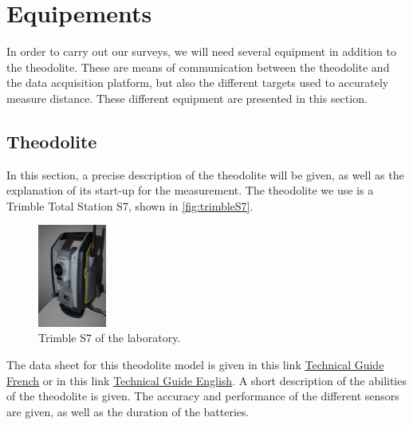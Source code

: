 \documentclass[10pt,letterpaper,oneside]{article}
\begin{document}
\section{Equipements}

In order to carry out our surveys, we will need several equipment in addition to the theodolite.
These are means of communication between the theodolite and the data acquisition platform, but also the different targets used to accurately measure distance.
These different equipment are presented in this section.


\subsection{Theodolite}


In this section, a precise description of the theodolite will be given, as well as the explanation of its start-up for the measurement.
The theodolite we use is a Trimble Total Station S7, shown in \autoref{fig:trimbleS7}.

\begin{figure}[htb]
	\centering
	\includegraphics[width=0.2\textwidth]{./figs/trimbleS7.JPG}
	\caption{Trimble S7 of the laboratory.}
	\label{fig:trimbleS7}
\end{figure}

The data sheet for this theodolite model is given in this link \href{run:S7_DS_french.pdf}{Technical Guide French} or in this link \href{run:S7_DS_english.pdf}{Technical Guide English}.
A short description of the abilities of the theodolite is given.
The accuracy and performance of the different sensors are given, as well as the duration of the batteries.
\end{document}
